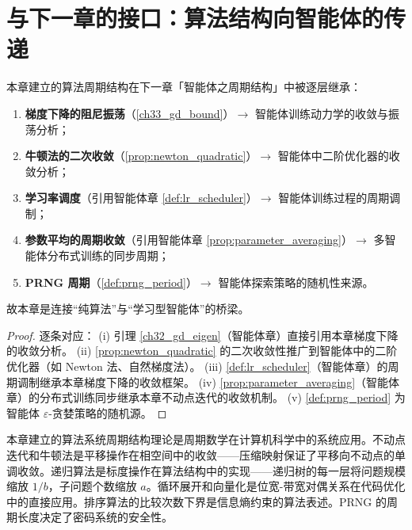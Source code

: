 \section{与下一章的接口：算法结构向智能体的传递}
\label{sec:algorithm_to_agent_interface}

\begin{proposition}[算法周期结构在智能体中的继承]\label{prop:algorithm_to_agent_inheritance}
本章建立的算法周期结构在下一章「智能体之周期结构」中被逐层继承：
\begin{enumerate}[label=(\roman*)]
    \item \textbf{梯度下降的阻尼振荡}（\cref{ch33_gd_bound}）$\to$ 智能体训练动力学的收敛与振荡分析；
    \item \textbf{牛顿法的二次收敛}（\cref{prop:newton_quadratic}）$\to$ 智能体中二阶优化器的收敛分析；
    \item \textbf{学习率调度}（引用智能体章 \cref{def:lr_scheduler}）$\to$ 智能体训练过程的周期调制；
    \item \textbf{参数平均的周期收敛}（引用智能体章 \cref{prop:parameter_averaging}）$\to$ 多智能体分布式训练的同步周期；
    \item \textbf{PRNG 周期}（\cref{def:prng_period}）$\to$ 智能体探索策略的随机性来源。
\end{enumerate}
故本章是连接“纯算法”与“学习型智能体”的桥梁。
\end{proposition}

\begin{proof}
逐条对应：
(i) 引理 \cref{ch32_gd_eigen}（智能体章）直接引用本章梯度下降的收敛分析。
(ii) \cref{prop:newton_quadratic} 的二次收敛性推广到智能体中的二阶优化器（如 Newton 法、自然梯度法）。
(iii) \cref{def:lr_scheduler}（智能体章）的周期调制继承本章梯度下降的收敛框架。
(iv) \cref{prop:parameter_averaging}（智能体章）的分布式训练同步继承本章不动点迭代的收敛机制。
(v) \cref{def:prng_period} 为智能体 $\varepsilon$-贪婪策略的随机源。
\end{proof}

\begin{remark}[与全书的统一]\label{rem:algorithm_chapter_unity}
本章建立的算法系统周期结构理论是周期数学在计算机科学中的系统应用。不动点迭代和牛顿法是平移操作在相空间中的收敛——压缩映射保证了平移向不动点的单调收敛。递归算法是标度操作在算法结构中的实现——递归树的每一层将问题规模缩放 $1/b$，子问题个数缩放 $a$。循环展开和向量化是位宽-带宽对偶关系在代码优化中的直接应用。排序算法的比较次数下界是信息熵约束的算法表述。PRNG 的周期长度决定了密码系统的安全性。
\end{remark}

